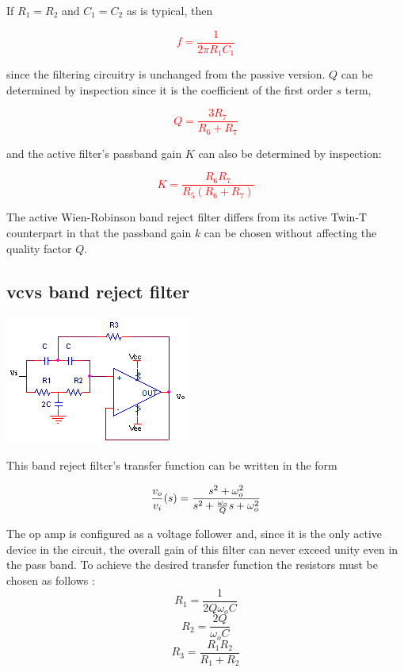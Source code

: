If $R_1 = R_2$ and $C_1 = C_2$ as is typical, then

\textcolor{red}{
\begin{equation}
f = \frac{1}{2\pi R_1 C_1}
\end{equation}
}

since the filtering circuitry is unchanged from the passive version.
$Q$ can be determined by inspection since it is the coefficient of the first order $s$ term,

\textcolor{red}{
\begin{equation}
Q = \frac{3R_7}{R_6 + R_7}
\end{equation}
}

and the active filter's passband gain $K$ can also be determined by inspection:

\textcolor{red}{
\begin{equation}
K = \frac{R_6 R_7}{R_5(R_6 + R_7)}
\end{equation}
}

The active Wien-Robinson band reject filter differs from its active Twin-T counterpart in that the passband gain $k$ can be chosen without affecting the quality factor $Q$.

\subsection{\ac{vcvs} band reject filter}
\begin{center}
	\includegraphics{schematics/vcvs_bandreject.PNG}
\end{center}
This band reject filter's transfer function can be written in the form

\textcolor{red}{
\begin{equation}
\frac{\vout}{\vin}(s) = \frac{s^2 + \omega_{o}^2}{s^2 + \frac{\omega_{o}}{Q}s + \omega_{o}^2}
\label{eq:vcvs_bandreject}
\end{equation}
}

The op amp is configured as a voltage follower and, since it is the only active device in the circuit, the overall gain of this filter can never exceed unity even in the pass band.
To achieve the desired transfer function the resistors must be chosen as follows \autocite[145-146]{op-amp-circuits-johnson}:
\begin{equation}
R_1 = \frac{1}{2Q\omega_{o}C}
\end{equation}
\begin{equation}
R_2 = \frac{2Q}{\omega_{o}C}
\end{equation}
\begin{equation}
R_3 = \frac{R_1 R_2}{R_1 + R_2}
\end{equation}

